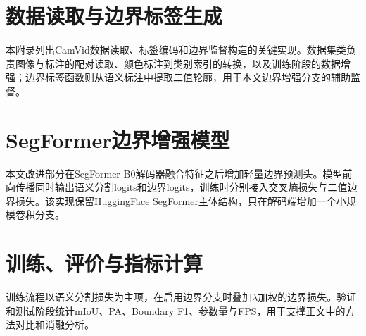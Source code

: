 \documentclass{report}
\begin{document}
\clearpage
\appendix
{}
\renewcommand{\thesection}{附录\Alph{section}}
\renewcommand{\thesubsection}{\Alph{section}.\arabic{subsection}}

\section{数据读取与边界标签生成}

本附录列出CamVid数据读取、标签编码和边界监督构造的关键实现。数据集类负责图像与标注的配对读取、颜色标注到类别索引的转换，以及训练阶段的数据增强；边界标签函数则从语义标注中提取二值轮廓，用于本文边界增强分支的辅助监督。





\section{SegFormer边界增强模型}

本文改进部分在SegFormer-B0解码器融合特征之后增加轻量边界预测头。模型前向传播同时输出语义分割logits和边界logits，训练时分别接入交叉熵损失与二值边界损失。该实现保留HuggingFace SegFormer主体结构，只在解码端增加一个小规模卷积分支。



\section{训练、评价与指标计算}

训练流程以语义分割损失为主项，在启用边界分支时叠加$\lambda$加权的边界损失。验证和测试阶段统计mIoU、PA、Boundary F1、参数量与FPS，用于支撑正文中的方法对比和消融分析。




\end{document}
